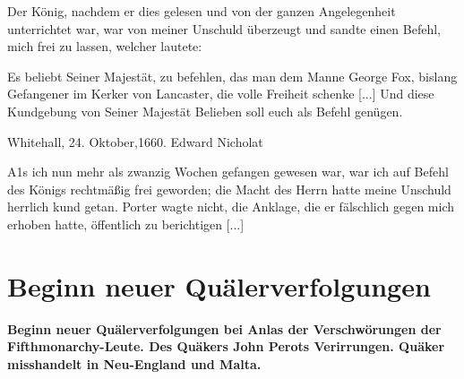 Der König, nachdem er dies gelesen und von der ganzen
Angelegenheit unterrichtet war, war von meiner Unschuld überzeugt 
und sandte einen Befehl, mich frei zu lassen, welcher lautete:

\glqq Es beliebt Seiner Majestät, zu befehlen, das man dem Manne
George Fox, bislang Gefangener im Kerker von Lancaster, die
volle Freiheit schenke [...] Und diese Kundgebung von Seiner
Majestät Belieben soll euch als Befehl genügen.\grqq{}

\begin{flushright}Whitehall, 24. Oktober,1660. Edward Nicholat\end{flushright}

A1s ich nun mehr als zwanzig Wochen gefangen gewesen
war, war ich auf Befehl des Königs rechtmäßig frei geworden;
die Macht des Herrn hatte meine Unschuld herrlich kund getan.
Porter wagte nicht, die Anklage, die er fälschlich gegen mich
erhoben hatte, öffentlich zu berichtigen [...]

\chapter[Beginn neuer Quälerverfolgungen]{Beginn neuer Quälerverfolgungen}

\begin{center}
\textbf{Beginn neuer Quälerverfolgungen bei Anlas der Verschwörungen
der Fifthmonarchy-Leute. Des Quäkers John Perots Verirrungen.
Quäker misshandelt in Neu-England und Malta.}
\end{center}

